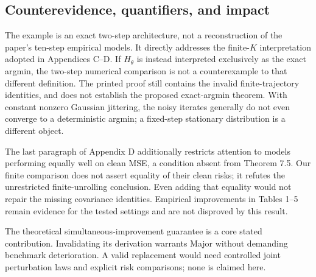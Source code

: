\documentclass[10pt]{article}
\begin{document}
\subsection*{Counterevidence, quantifiers, and impact}
The example is an exact two-step architecture, not a reconstruction of the paper’s ten-step empirical models. It directly addresses the finite-\(K\) interpretation adopted in Appendices C–D. If \(H_\theta\) is instead interpreted exclusively as the exact argmin, the two-step numerical comparison is not a counterexample to that different definition. The printed proof still contains the invalid finite-trajectory identities, and does not establish the proposed exact-argmin theorem. With constant nonzero Gaussian jittering, the noisy iterates generally do not even converge to a deterministic argmin; a fixed-step stationary distribution is a different object.\par
The last paragraph of Appendix D additionally restricts attention to models performing equally well on clean MSE, a condition absent from Theorem 7.5. Our finite comparison does not assert equality of their clean risks; it refutes the unrestricted finite-unrolling conclusion. Even adding that equality would not repair the missing covariance identities. Empirical improvements in Tables 1–5 remain evidence for the tested settings and are not disproved by this result.\par
The theoretical simultaneous-improvement guarantee is a core stated contribution. Invalidating its derivation warrants Major without demanding benchmark deterioration. A valid replacement would need controlled joint perturbation laws and explicit risk comparisons; none is claimed here.\par
\end{document}
